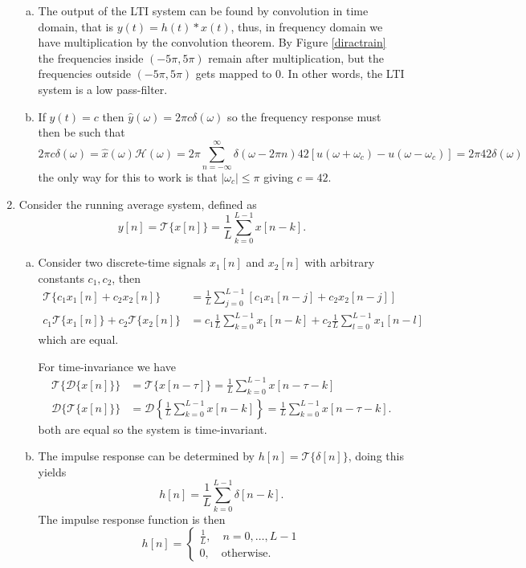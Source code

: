 \begin{enumerate}
\begin{enumerate}[a)]
\item The output of the LTI system can be found by convolution in time domain, that is $y(t)=h(t)*x(t)$, thus, in frequency domain we have multiplication by the convolution theorem. By Figure \ref{diractrain} the frequencies inside $(-5\pi,5\pi)$ remain after multiplication, but the frequencies outside $(-5\pi,5\pi)$ gets mapped to $0$. In other words, the LTI system is a low pass-filter. 

\item If $y(t)=c$ then $\hat{y}(\omega)=2\pi c\delta(\omega)$ so the frequency response must then be such that
$$2\pi c\delta(\omega)=\hat{x}(\omega)\mathcal{H}(\omega)=2\pi\sum_{n=-\infty}^{\infty}\delta(\omega-2\pi n)42[u(\omega+\omega_{c})-u(\omega-\omega_{c})]=2\pi42\delta(\omega)$$
the only way for this to work is that $|\omega_{c}|\le\pi$ giving $c=42$. 
\end{enumerate}

\item Consider the running average system, defined as
$$y[n]=\mathcal{T}\{x[n]\}=\frac{1}{L}\sum_{k=0}^{L-1}x[n-k].$$

\begin{enumerate}[a)]
\item Consider two discrete-time signals $x_{1}[n]$ and $x_{2}[n]$ with arbitrary constants $c_{1},c_{2}$, then
\begin{align*}
    \mathcal{T}\{c_{1}x_{1}[n]+c_{2}x_{2}[n]\}&=\frac{1}{L}\sum_{j=0}^{L-1}[c_{1}x_{1}[n-j]+c_{2}x_{2}[n-j]] \\
    c_{1}\mathcal{T}\{x_{1}[n]\}+c_{2}\mathcal{T}\{x_{2}[n]\}&=c_{1}\frac{1}{L}\sum_{k=0}^{L-1}x_{1}[n-k]+c_{2}\frac{1}{L}\sum_{l=0}^{L-1}x_{1}[n-l]
\end{align*}
which are equal. 

For time-invariance we have
\begin{align*}
    \mathcal{T}\{\mathcal{D}\{x[n]\}\}&=\mathcal{T}\{x[n-\tau]\}=\frac{1}{L}\sum_{k=0}^{L-1}x[n-\tau-k] \\
    \mathcal{D}\{\mathcal{T}\{x[n]\}\}&=\mathcal{D}\left\{\frac{1}{L}\sum_{k=0}^{L-1}x[n-k]\right\}=\frac{1}{L}\sum_{k=0}^{L-1}x[n-\tau-k].
\end{align*}
both are equal so the system is time-invariant. 

\item The impulse response can be determined by $h[n]=\mathcal{T}\{\delta[n]\}$, doing this yields
$$h[n]=\frac{1}{L}\sum_{k=0}^{L-1}\delta[n-k].$$
The impulse response function is then
$$h[n]=\begin{cases}
    \frac{1}{L}, \quad n=0,\hdots,L-1 \\
    0, \quad \text{otherwise}.
\end{cases}$$


\end{enumerate}
\end{enumerate}
